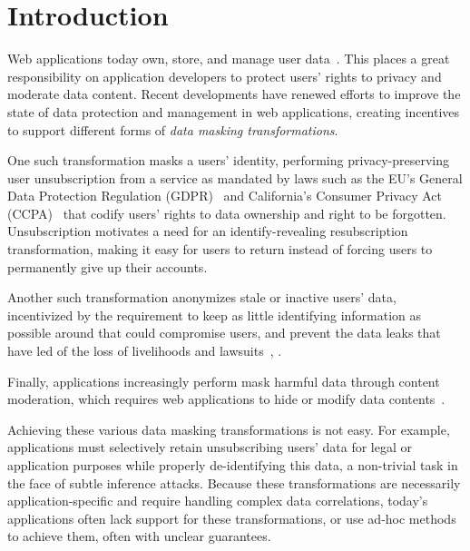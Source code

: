 \section{Introduction}
Web applications today own, store, and manage user data~\cite{nytimes:fb, npr:data}. 
This places a great responsibility on application developers to protect users' rights to privacy and
moderate data content.
%
Recent developments have renewed efforts to improve the state of data protection and management in
web applications, creating incentives to support different forms of \emph{data masking 
transformations}. 

One such transformation masks a users' identity, performing privacy-preserving user unsubscription from a service as mandated
by laws such as the EU's General Data Protection Regulation (GDPR)~\cite{eu:gdpr} and California's
Consumer Privacy Act (CCPA)~\cite{ca:privacy-act} that codify users' rights to data ownership and
right to be forgotten.  Unsubscription motivates a need for an identify-revealing resubscription
transformation, making it easy for users to return instead of forcing users to permanently give up
their accounts.

Another such transformation anonymizes stale or inactive users' data, 
incentivized by the requirement to keep as little identifying information as possible
around that could compromise users, and prevent the data leaks that have led of the loss of livelihoods and
lawsuits~\cite{breach:amazon,breach:twitter, breach:fb, breach:marriott, breach:quora}, .

Finally, applications increasingly perform mask harmful data through content moderation, which requires web
applications to hide or modify data contents~\cite{contentmod, sasb}.

Achieving these various data masking transformations is not easy.  For example, applications must
selectively retain unsubscribing users' data for legal or application purposes while properly
de-identifying this data, a non-trivial task in the face of subtle inference attacks.  Because these
transformations are necessarily application-specific and require handling complex data correlations,
today's applications often lack support for these transformations, or use ad-hoc methods to achieve
them, often with unclear guarantees.

